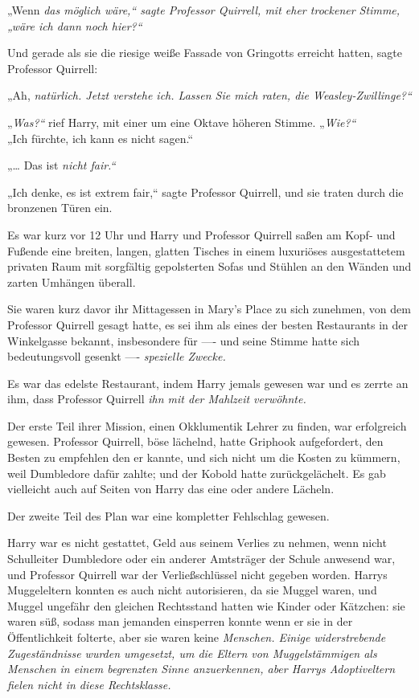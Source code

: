 {„Wenn \emph{das möglich wäre,“ sagte Professor Quirrell, mit eher trockener Stimme, „wäre ich dann noch \emph{hier?“}}

Und gerade als sie die riesige weiße Fassade von Gringotts erreicht hatten, sagte Professor Quirrell:

„Ah, \emph{natürlich. Jetzt verstehe ich. Lassen Sie mich raten, die Weasley-Zwillinge?“}

„\emph{Was?“} rief Harry, mit einer um eine Oktave höheren Stimme. „\emph{Wie?“}\\ „Ich fürchte, ich kann es nicht sagen.“

„… Das ist \emph{nicht fair.“}

„Ich denke, es ist extrem fair,“ sagte Professor Quirrell, und sie traten durch die bronzenen Türen ein.

Es war kurz vor 12 Uhr und Harry und Professor Quirrell saßen am Kopf- und Fußende eine breiten, langen, glatten Tisches in einem luxuriöses ausgestattetem privaten Raum mit sorgfältig gepolsterten Sofas und Stühlen an den Wänden und zarten Umhängen überall.

Sie waren kurz davor ihr Mittagessen in Mary's Place zu sich zunehmen, von dem Professor Quirrell gesagt hatte, es sei ihm als eines der besten Restaurants in der Winkelgasse bekannt, insbesondere für ---- und seine Stimme hatte sich bedeutungsvoll gesenkt ---- \emph{spezielle Zwecke.}

Es war das edelste Restaurant, indem Harry jemals gewesen war und es zerrte an ihm, dass Professor Quirrell \emph{ihn mit der Mahlzeit verwöhnte.}

Der erste Teil ihrer Mission, einen Okklumentik Lehrer zu finden, war erfolgreich gewesen. Professor Quirrell, böse lächelnd, hatte Griphook aufgefordert, den Besten zu empfehlen den er kannte, und sich nicht um die Kosten zu kümmern, weil Dumbledore dafür zahlte; und der Kobold hatte zurückgelächelt. Es gab vielleicht auch auf Seiten von Harry das eine oder andere Lächeln.

Der zweite Teil des Plan war eine kompletter Fehlschlag gewesen.

Harry war es nicht gestattet, Geld aus seinem Verlies zu nehmen, wenn nicht Schulleiter Dumbledore oder ein anderer Amtsträger der Schule anwesend war, und Professor Quirrell war der Verließschlüssel nicht gegeben worden. Harrys Muggeleltern konnten es auch nicht autorisieren, da sie Muggel waren, und Muggel ungefähr den gleichen Rechtsstand hatten wie Kinder oder Kätzchen: sie waren süß, sodass man jemanden einsperren konnte wenn er sie in der Öffentlichkeit folterte, aber sie waren keine \emph{Menschen. Einige widerstrebende Zugeständnisse wurden umgesetzt, um die Eltern von Muggelstämmigen als Menschen in einem begrenzten Sinne anzuerkennen, aber Harrys Adoptiveltern fielen nicht in diese Rechtsklasse.}

}
